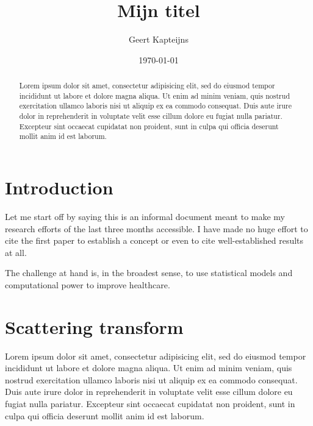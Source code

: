 \documentclass[twocolumn, openany, twoside, article]{memoir}
\title{Mijn titel}
\author{Geert Kapteijns}
\date{\today}
\begin{document}
\maketitle
\pagestyle{simple}

\begin{abstract}

Lorem ipsum dolor sit amet, consectetur adipisicing elit, sed do eiusmod
tempor incididunt ut labore et dolore magna aliqua. Ut enim ad minim veniam,
quis nostrud exercitation ullamco laboris nisi ut aliquip ex ea commodo
consequat. Duis aute irure dolor in reprehenderit in voluptate velit esse
cillum dolore eu fugiat nulla pariatur. Excepteur sint occaecat cupidatat non
proident, sunt in culpa qui officia deserunt mollit anim id est laborum.

\end{abstract}

\chapter{Introduction}

Let me start off by saying this is an informal document meant to make my
research efforts of the last three months accessible. I have made no huge effort
to cite the first paper to establish a concept or even to cite well-established
results at all.

The challenge at hand is, in the broadest sense, to use statistical models and computational power to improve healthcare.

\chapter{Scattering transform}


Lorem ipsum dolor sit amet, consectetur adipisicing elit, sed do eiusmod tempor
incididunt ut labore et dolore magna aliqua. Ut enim ad minim veniam, quis
nostrud exercitation ullamco laboris nisi ut aliquip ex ea commodo consequat.
Duis aute irure dolor in reprehenderit in voluptate velit esse cillum dolore eu
fugiat nulla pariatur. Excepteur sint occaecat cupidatat non proident, sunt in
culpa qui officia deserunt mollit anim id est laborum.

\cite{bruna2013invariant}

\printbibliography
\end{document}
